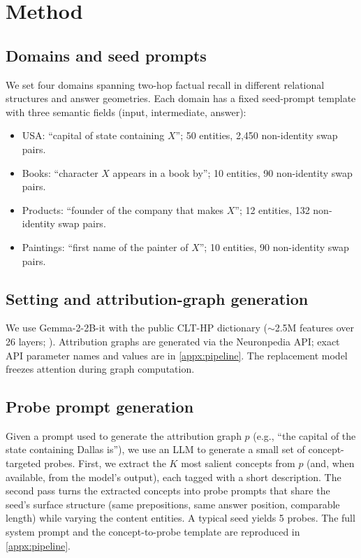 \section{Method}
\label{sec:method}

\subsection{Domains and seed prompts}
\label{sec:method:domains}
We set  four domains spanning two-hop factual recall in different relational structures and answer geometries. Each domain has a fixed seed-prompt template with three semantic fields (input, intermediate, answer): 
\begin{itemize}\itemsep0pt
\item USA: ``capital of state containing $X$''; 50 entities, 2{,}450 non-identity swap pairs.
\item Books: ``character $X$ appears in a book by''; 10 entities, 90 non-identity swap pairs.
\item Products: ``founder of the company that makes $X$''; 12 entities, 132 non-identity swap pairs.
\item Paintings: ``first name of the painter of $X$''; 10 entities, 90 non-identity swap pairs.
\end{itemize}

\subsection{Setting and attribution-graph generation}
\label{sec:method:setting}
We use Gemma-2-2B-it with the public CLT-HP dictionary ($\sim$2.5M features over 26 layers; \citealp{hanna2025clthp,ameisen2025circuittracing}). Attribution graphs are generated via the Neuronpedia API; exact API parameter names and values are in \cref{appx:pipeline}. The replacement model freezes attention during graph computation.

\subsection{Probe prompt generation}
\label{sec:method:probes}
Given a prompt used to generate the attribution graph $p$ (e.g., ``the capital of the state containing Dallas is''), we use an LLM to generate a small set of concept-targeted probes. First, we extract the $K$ most salient concepts from $p$ (and, when available, from the model's output), each tagged with a short description. The second pass turns the extracted concepts into probe prompts that share the seed's surface structure (same prepositions, same answer position, comparable length) while varying the content entities. A typical seed yields 5 probes. The full system prompt and the concept-to-probe template are reproduced in \cref{appx:pipeline}.

